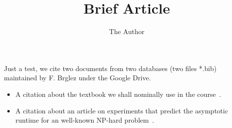 \documentclass[11pt, oneside]{article}   	%
\title{Brief Article}
\author{The Author}
\begin{document}
\maketitle

   
\vspace*{3ex}\noindent
Just a test, we  cite two documents from two databases (two files *.bib) maintained by F. Brglez under the Google Drive.
\begin{itemize}
\item
A citation about the textbook we shall nominally use in the 
course~\cite{OPUS-book_opt-2014-Springer-Cortez-OptimizationWithR}.
\item
A citation  about an article on experiments that predict the asymptotic runtime for
an well-known NP-hard problem~\cite{OPUS2-2017-labs-Elsevier-Boskovic}. 
\end{itemize}  




%
\end{document}
